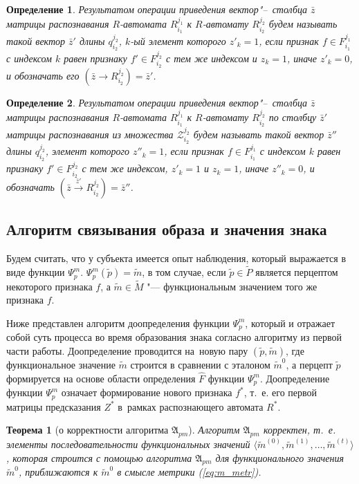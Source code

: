 \documentclass[a4paper, 12pt]{article}
\theoremstyle{plain}
\newtheorem{Theorem}{Теорема}
\newtheorem{Def}{Определение}
\begin{document}
	\begin{Def}
		Результатом операции приведения вектор"--~столбца $\bar z$ матрицы распознавания $R$-автомата $R_{i_1}^{j_1}$ к $R$-автомату $R_{i_2}^{j_2}$ будем называть такой вектор $\bar z'$ длины $q_{i_2}^{j_2}$, $k$-ый элемент которого $z'_k=1$, если признак $f\in F_{i_1}^{j_1}$ с индексом $k$ равен признаку $f'\in F_{i_2}^{j_2}$ с тем же индексом и $z_k=1$, иначе $z'_k=0$, и обозначать его $(\bar z\rightarrow R_{i_2}^{j_2})=\bar z'$.
	\end{Def}
	
	\begin{Def}
		Результатом операции приведения вектор"--~столбца $\bar z$ матрицы распознавания $R$-автомата $R_{i_1}^{j_1}$ к $R$-автомату $R_{i_2}^{j_2}$ по столбцу $\bar z'$ матрицы распознавания из множества  $\mathcal Z_{i_2}^{j_2}$ будем называть такой вектор $\bar z''$ длины $q_{i_2}^{j_2}$, элемент которого $z''_k=1$, если признак $f\in F_{i_1}^{j_1}$ с индексом $k$ равен признаку $f'\in F_{i_2}^{j_2}$ с тем же индексом, $z'_k=1$ и $z_k=1$, иначе $z''_k=0$, и обозначать $(\bar z\xrightarrow{\bar z'} R_{i_2}^{j_2})=\bar z''$.
	\end{Def}

	
	\subsection{Алгоритм связывания образа и значения знака}
	Будем считать, что у субъекта имеется опыт наблюдения, который выражается в виде функции $\Psi_p^m$. $\Psi_p^m(\tilde p)=\tilde m$, в том случае, если $\tilde p\in\tilde P$ является перцептом некоторого признака $f$, а $\tilde m\in\tilde M$ "--- функциональным значением того же признака $f$.
	
	Ниже представлен алгоритм доопределения функции $\Psi_p^m$, который и отражает собой суть процесса во время образования знака согласно алгоритму из первой части работы. Доопределение проводится на~новую пару $(\tilde p,\tilde m)$, где функциональное значение $\tilde m$ строится в сравнении с эталоном $\tilde m^0$, а перцепт $\tilde p$ формируется на основе области определения $\hat F$ функции $\Psi_p^m$. Доопределение функции $\Psi_p^m$ означает формирование нового признака $f^*$, т.~е. его первой матрицы предсказания $Z^*$ в~рамках распознающего автомата $R^*$.
		
	\begin{Theorem}[о корректности алгоритма $\mathfrak A_{pm}$]
		Алгоритм $\mathfrak A_{pm}$ корректен, т.~е. элементы последовательности функциональных значений $\langle\tilde m^{(0)},\tilde m^{(1)},\dots,\tilde m^{(t)}\rangle$, которая строится с помощью алгоритма $\mathfrak A_{pm}$ для функционального значения $\tilde m^0$, приближаются к $\tilde m^0$ в смысле метрики (\ref{eq:m_metr}).
	\end{Theorem}
	
\end{document}

